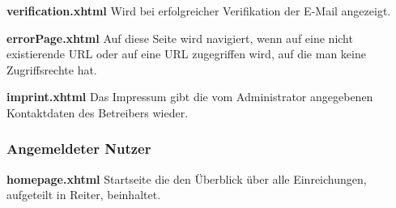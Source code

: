 \begin{samepage}
    \textbf{verification.xhtml} Wird bei erfolgreicher Verifikation der E-Mail angezeigt.
    \nopagebreak

\end{samepage}


\begin{samepage}
    \textbf{errorPage.xhtml} Auf diese Seite wird navigiert, wenn auf eine nicht existierende URL oder auf eine URL zugegriffen wird, auf die man keine Zugriffsrechte hat.
    \nopagebreak

\end{samepage}

\begin{samepage}
    \textbf{imprint.xhtml} Das Impressum gibt die vom Administrator angegebenen Kontaktdaten des Betreibers wieder.\nopagebreak

\end{samepage}

\subsubsection{Angemeldeter Nutzer}

\textbf{homepage.xhtml}  \label{flt:homepage} Startseite die den Überblick über alle Einreichungen, aufgeteilt in Reiter, beinhaltet.

